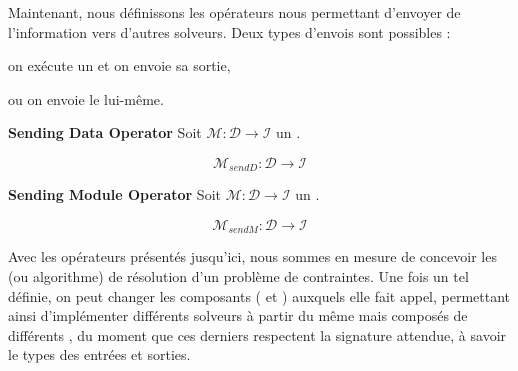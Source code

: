 Maintenant, nous définissons les  opérateurs nous permettant d'envoyer de  l'information vers  d'autres  solveurs. Deux  types d'envois  sont possibles :
\begin{inparaenum}[i)]
	\item on exécute un \m{} et on envoie sa sortie,
	\item ou on envoie le \m{} lui-même.
\end{inparaenum}

\begin{definition}\label{op:osend}
{\bf Sending Data Operator} Soit $\mathcal{M} : \mathcal{D} \rightarrow \mathcal{I}$ un \m. 

\[
\mathcal{M}_{sendD}:\mathcal{D} \rightarrow \mathcal{I}
\]
\end{definition}

\begin{definition}\label{op:msend}
{\bf Sending Module Operator} Soit $\mathcal{M} : \mathcal{D} \rightarrow \mathcal{I}$ un \m. 

\[
\mathcal{M}_{sendM}:\mathcal{D} \rightarrow \mathcal{I}
\]
\end{definition}

Avec  les opérateurs  présentés jusqu'ici,  nous sommes  en mesure  de concevoir les \ass{} (ou algorithme) de résolution d'un problème de contraintes. Une fois un  tel \as{} définie, on  peut changer les composants (\oms{} et \opchs) auxquels elle fait appel, permettant  ainsi d'implémenter différents solveurs à partir du même \as{} mais composés de différents \ms, du moment que ces derniers respectent  la signature attendue, à savoir le types des entrées et sorties.




